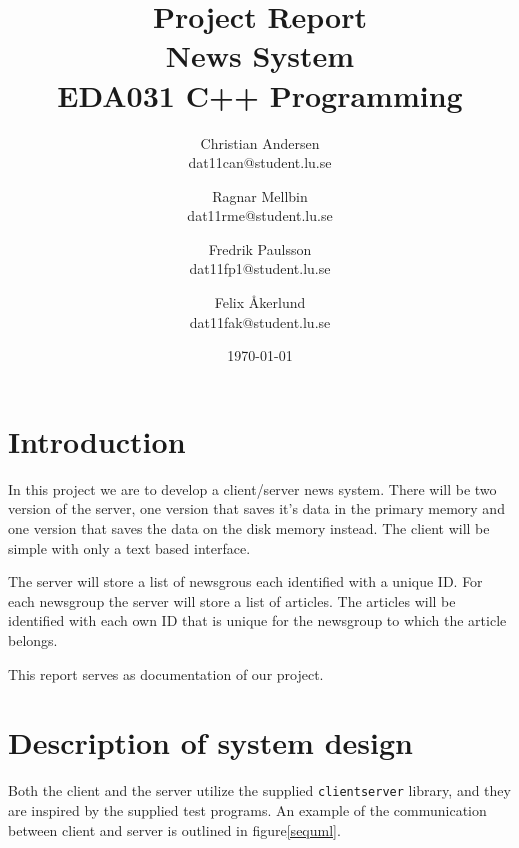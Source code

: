 \documentclass[a4paper]{article}
\title{Project Report \\ News System  \\ EDA031 C++ Programming}
\date{\today}
\author{Christian Andersen \\ dat11can@student.lu.se \and Ragnar Mellbin \\ dat11rme@student.lu.se \and Fredrik Paulsson \\ dat11fp1@student.lu.se
\and Felix \AA kerlund \\ dat11fak@student.lu.se}
\begin{document}
\clearpage\maketitle
\thispagestyle{empty}
\newpage


\section{Introduction}
In this project we are to develop a client/server news system. There will be two version of the server, one version that saves it's data in the primary memory and one version that saves the data on the disk memory instead. The client will be simple with only a text based interface.

The server will store a list of newsgrous each identified with a unique ID. For each newsgroup the server will store a list of articles. The articles will be identified with each own ID that is unique for the newsgroup to which the article belongs.

This report serves as documentation of our project.

\section{Description of system design}

Both the client and the server utilize the supplied \texttt{clientserver} library, and they are inspired by the supplied test programs. An example of the communication between client and server is outlined in figure\ref{sequml}.
\end{document}
